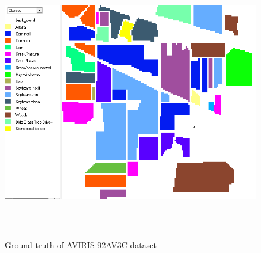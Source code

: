 \documentclass[document.tex]{subfiles}
\begin{document}
\begin{figure}[H]
	\begin{center}
		\includegraphics[height=12.0cm]{imgs/Ground.png}
	\end{center}
	\caption{Ground truth of AVIRIS 92AV3C dataset}
	\label{fig:Ground truth of AVIRIS 92AV3C dataset}
\end{figure}
\end{document}
